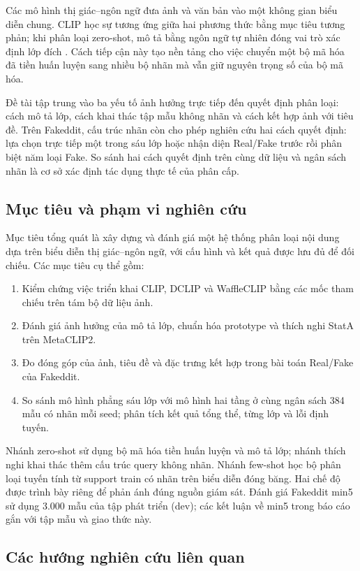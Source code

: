 \documentclass[12pt,a4paper]{article}
\numberwithin{figure}{section}
\numberwithin{table}{section}
\numberwithin{equation}{section}
\begin{document}
Các mô hình thị giác--ngôn ngữ đưa ảnh và văn bản vào một không gian biểu diễn chung. CLIP học sự tương ứng giữa hai phương thức bằng mục tiêu tương phản; khi phân loại zero-shot, mô tả bằng ngôn ngữ tự nhiên đóng vai trò xác định lớp đích \cite{clip}. Cách tiếp cận này tạo nền tảng cho việc chuyển một bộ mã hóa đã tiền huấn luyện sang nhiều bộ nhãn mà vẫn giữ nguyên trọng số của bộ mã hóa.

Đề tài tập trung vào ba yếu tố ảnh hưởng trực tiếp đến quyết định phân loại: cách mô tả lớp, cách khai thác tập mẫu không nhãn và cách kết hợp ảnh với tiêu đề. Trên Fakeddit, cấu trúc nhãn còn cho phép nghiên cứu hai cách quyết định: lựa chọn trực tiếp một trong sáu lớp hoặc nhận diện Real/Fake trước rồi phân biệt năm loại Fake. So sánh hai cách quyết định trên cùng dữ liệu và ngân sách nhãn là cơ sở xác định tác dụng thực tế của phân cấp.

\subsection{Mục tiêu và phạm vi nghiên cứu}
Mục tiêu tổng quát là xây dựng và đánh giá một hệ thống phân loại nội dung dựa trên biểu diễn thị giác--ngôn ngữ, với cấu hình và kết quả được lưu đủ để đối chiếu. Các mục tiêu cụ thể gồm:
\begin{enumerate}
\item Kiểm chứng việc triển khai CLIP, DCLIP và WaffleCLIP bằng các mốc tham chiếu trên tám bộ dữ liệu ảnh.
\item Đánh giá ảnh hưởng của mô tả lớp, chuẩn hóa prototype và thích nghi StatA trên MetaCLIP2.
\item Đo đóng góp của ảnh, tiêu đề và đặc trưng kết hợp trong bài toán Real/Fake của Fakeddit.
\item So sánh mô hình phẳng sáu lớp với mô hình hai tầng ở cùng ngân sách 384 mẫu có nhãn mỗi seed; phân tích kết quả tổng thể, từng lớp và lỗi định tuyến.
\end{enumerate}

Nhánh zero-shot sử dụng bộ mã hóa tiền huấn luyện và mô tả lớp; nhánh thích nghi khai thác thêm cấu trúc query không nhãn. Nhánh few-shot học bộ phân loại tuyến tính từ support train có nhãn trên biểu diễn đóng băng. Hai chế độ được trình bày riêng để phản ánh đúng nguồn giám sát. Đánh giá Fakeddit min5 sử dụng 3.000 mẫu của tập phát triển (dev); các kết luận về min5 trong báo cáo gắn với tập mẫu và giao thức này.

\subsection{Các hướng nghiên cứu liên quan}
\end{document}
